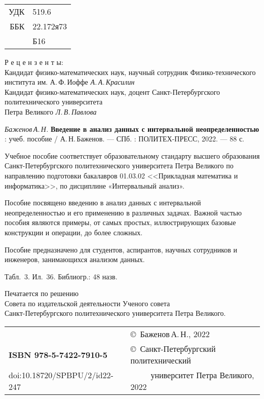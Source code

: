 \documentclass[a5paper,openany]{book}
\begin{document}
\newpage
{\small
\begin{tabular}{rl}
	УДК & 519.6 \\	
	ББК  & 22.172я73\\
	~~~ & Б16
\end{tabular}


\begin{center}
Р е ц е н з е н т ы:\\

Кандидат физико-математических наук, научный сотрудник Физико-технического института им. А.\,Ф.\,Иоффе
{\it А.\,А.\,Красилин}\\
Кандидат физико-математических наук, доцент Санкт-Петербургского политехнического  университета \\ Петра Великого {\it Л.\,В.\,Павлова}
 \end{center}

{\it Баженов\,А.\,Н.}
{\bf Введение в анализ данных с интервальной неопределенностью} : учеб. пособие /  А.\,Н.\,Баженов.
--- СПб. : ПОЛИТЕХ-ПРЕСС, 2022. --- 88 с.
\hfill \break

{\small 
	Учебное пособие соответствует образовательному стандарту высшего
образования Санкт-Петербургского политехнического университета Петра Великого по направлению подготовки бакалавров 01.03.02 <<Прикладная математика и информатика>>, по дисциплине «Интервальный анализ».


Пособие посвящено введению в анализ данных с интервальной неопределенностью
и его применению в различных задачах.  
Важной частью пособия являются примеры, от самых простых, иллюстрирующих базовые конструкции и операции, до более сложных.

Пособие предназначено для студентов, аспирантов, научных сотрудников и инженеров, 
занимающихся анализом данных.


\hfill \break
Табл.~3. Ил.~36. Библиогр.: 48 назв.
\hfill \break
\hfill \break

 \begin{center}
{\small  	
Печатается по решению\\
Совета по издательской деятельности Ученого совета\\
Санкт-Петербургского политехнического  университета Петра Великого. }
 \end{center}

\hfill \break
\begin{tabular}{ll}
	~ & \copyright  \ Баженов\,А.\,Н., 2022 \\
{\bf ISBN 978-5-7422-7910-5} & \copyright \
Санкт-Петербургский политехнический \\
doi:10.18720/SPBPU/2/id22-247 & ~~~~~университет Петра Великого, 2022
\end{tabular}
}

}
\end{document}

